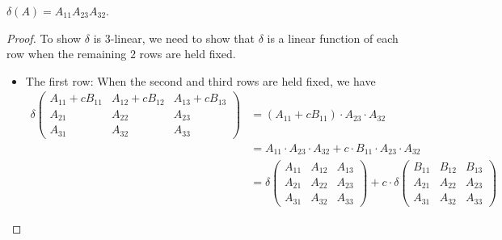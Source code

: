 \begin{exercise} \label{exercise 4.5.5}
\(\delta(A)= A_{11}A_{23}A_{32}\).
\end{exercise}

\begin{proof}
To show \(\delta\) is \(3\)-linear, we need to show that \(\delta\) is a linear function of each row when the remaining \(2\) rows are held fixed.

\begin{itemize}
\item The first row: When the second and third rows are held fixed, we have
\begin{align*}
    \delta\begin{pmatrix}
        A_{11}+c B_{11} & A_{12}+c B_{12} & A_{13}+c B_{13} \\
        A_{21} & A_{22} & A_{23} \\
        A_{31} & A_{32} & A_{33}
    \end{pmatrix}
    & = \left(A_{11}+c B_{11}\right) \cdot A_{23} \cdot A_{32} \\
    & = A_{11} \cdot A_{23} \cdot A_{32} + c \cdot B_{11} \cdot A_{23} \cdot A_{32} \\
    & = \delta\begin{pmatrix}
        A_{11} & A_{12} & A_{13} \\
        A_{21} & A_{22} & A_{23} \\
        A_{31} & A_{32} & A_{33}
    \end{pmatrix}
    + c \cdot \delta\begin{pmatrix}
        B_{11} & B_{12} & B_{13} \\
        A_{21} & A_{22} & A_{23} \\
        A_{31} & A_{32} & A_{33}
    \end{pmatrix}
\end{align*}


\end{itemize}
\end{proof}
